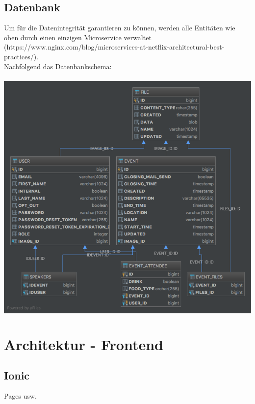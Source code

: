 \documentclass[11pt]{article} %
\begin{document}
\subsection{Datenbank}
Um für die Datenintegrität garantieren zu können, werden alle Entitäten wie oben durch einen einzigen Microservice verwaltet (https://www.nginx.com/blog/microservices-at-netflix-architectural-best-practices/).
\\
Nachfolgend das Datenbankschema:
\\
\\
\includegraphics[width=1\textwidth]{dbSchema}
\\

\newpage
\section{Architektur - Frontend}
\subsection{Ionic}
Pages usw.




\newpage
\end{document}
